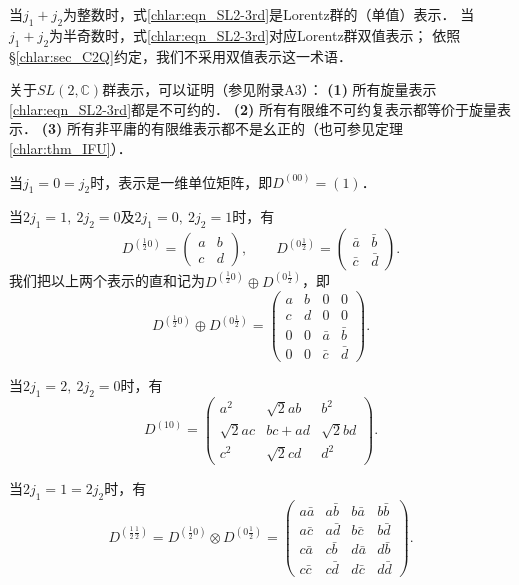 当$j_1+j_2$为整数时，式\eqref{chlar:eqn_SL2-3rd}是Lorentz群的（单值）表示．
当$j_1+j_2$为半奇数时，式\eqref{chlar:eqn_SL2-3rd}对应Lorentz群{\kaishu 双值表示}；
依照\S\ref{chlar:sec_C2Q}约定，我们不采用双值表示这一术语．

关于$SL(2,\mathbb{C})$群表示，可以证明（参见\parencite{carmeli-rl1976}附录A3）：
{\bfseries (1)} 所有旋量表示\eqref{chlar:eqn_SL2-3rd}都是不可约的．
{\bfseries (2)} 所有有限维不可约复表示都等价于旋量表示．
{\bfseries (3)} 所有非平庸的有限维表示都不是幺正的（也可参见定理\ref{chlar:thm_IFU}）．


当$j_1=0=j_2$时，表示是一维单位矩阵，即$D^{(00)}=(1)$．

当$2j_1=1,\ 2j_2=0$及$2j_1=0,\ 2j_2=1$时，有
\begin{equation}
    D^{(\frac{1}{2}0)} = \begin{pmatrix} a & b   \\ c & d   \end{pmatrix},\qquad
    D^{(0\frac{1}{2})} = \begin{pmatrix} \bar{a} & \bar{b}   \\ \bar{c} & \bar{d}   \end{pmatrix}.
\end{equation}
我们把以上两个表示的直和记为$D^{(\frac{1}{2}0)} \oplus D^{(0\frac{1}{2})}$，即
\begin{equation}
    D^{(\frac{1}{2}0)} \oplus D^{(0\frac{1}{2})}= 
    \begin{pmatrix}
        a & b & 0 & 0   \\ 
        c & d & 0 & 0 \\
        0 & 0 & \bar{a} & \bar{b}  \\ 
        0 & 0 & \bar{c} & \bar{d}
    \end{pmatrix}.
\end{equation}

当$2j_1=2,\ 2j_2=0$时，有
\begin{equation}
    D^{(10)} = \begin{pmatrix} 
            a^2 & \sqrt{2} a b & b^2 \\
            \sqrt{2} a c & b c+a d & \sqrt{2} b d \\
            c^2 & \sqrt{2} c d & d^2 
    \end{pmatrix}.
\end{equation}


当$2j_1=1= 2j_2$时，有
\begin{equation}
    D^{(\frac{1}{2}\frac{1}{2})} 
    =D^{(\frac{1}{2}0)} \otimes D^{(0\frac{1}{2})}
    =\begin{pmatrix} a \bar{a} & a \bar{b} & b \bar{a} & b \bar{b} \\
        a \bar{c} & a \bar{d} & b \bar{c} & b \bar{d} \\
        c \bar{a} & c \bar{b} & d \bar{a} & d \bar{b} \\
        c \bar{c} & c \bar{d} & d \bar{c} & d \bar{d} 
    \end{pmatrix}  .
\end{equation}

